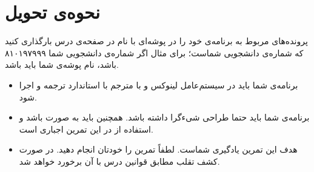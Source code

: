 \documentclass{utap}
\begin{document}
    \section{نحوه‌ی تحویل}
        پرونده‌‌های مربوط به برنامه‌ی خود را در پوشه‌ای با نام  در صفحه‌ی  درس بارگذاری کنید که  شماره‌ی دانشجویی شماست؛ برای مثال اگر شماره‌ی دانشجویی شما ۸۱۰۱۹۷۹۹۹ باشد، نام پوشه‌ی شما باید  باشد.
        \begin{itemize}
            \item
                        برنامه‌ی شما باید در سیستم‌عامل لینوکس و با مترجم  با استاندارد  ترجمه و اجرا شود.
                    \item
                        برنامه‌ی شما باید حتما طراحی شیءگرا داشته باشد. همچنین باید به صورت  باشد و استفاده از  در این تمرین اجباری است.
                    \item
                        هدف این تمرین یادگیری شماست. لطفاً تمرین را خودتان انجام دهید. در صورت کشف تقلب مطابق قوانین درس با آن برخورد خواهد شد.
        \end{itemize}
\end{document}
